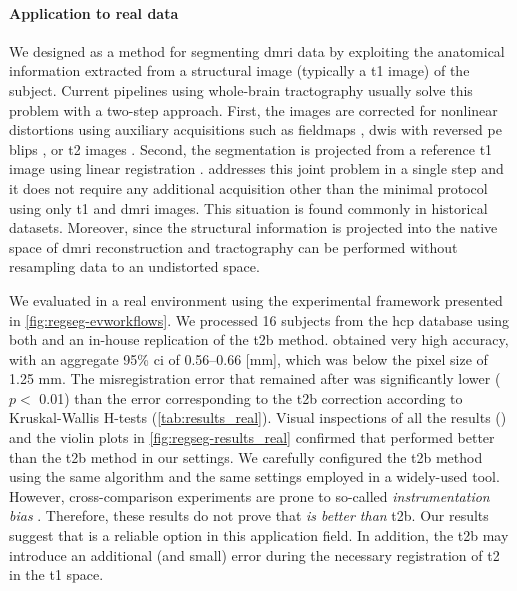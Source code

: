 \paragraph*{Application to real data}
We designed \regseg{} as a method for segmenting \gls*{dmri} data by exploiting the
  anatomical information extracted from a structural image (typically a \gls*{t1} image)
  of the subject.
Current pipelines using whole-brain tractography usually solve this problem with a two-step approach.
First, the images are corrected for nonlinear distortions using auxiliary acquisitions
  such as fieldmaps \citep{jezzard_correction_1995}, \glspl*{dwi} with reversed \gls*{pe}
  blips \citep{chiou_simple_2000}, or \gls*{t2} images \citep{kybic_unwarping_2000}.
Second, the segmentation is projected from a reference \gls*{t1} image using linear
  registration \citep{greve_accurate_2009}.
\Regseg{} addresses this joint problem in a single step and it does not require any additional
  acquisition other than the minimal protocol using only \gls*{t1} and \gls*{dmri} images.
This situation is found commonly in historical datasets.
Moreover, since the structural information is projected into the native space of \gls*{dmri}
  reconstruction and tractography can be performed without resampling data to an undistorted
  space.

We evaluated \regseg{} in a real environment using the experimental framework presented
  in \autoref{fig:regseg-evworkflows}.
We processed 16 subjects from the \gls*{hcp} database using both \regseg{}
  and an in-house replication of the \acrfull*{t2b} method.
\Regseg{} obtained very high accuracy, with an aggregate 95\% \gls*{ci} of 0.56--0.66 [mm], which was
  below the pixel size of 1.25 mm.
The misregistration error that remained after \regseg{} was significantly lower ($p <$ 0.01) than the
  error corresponding to the \gls*{t2b} correction according to Kruskal-Wallis H-tests
  (\autoref{tab:results_real}).
Visual inspections of all the results () and the violin plots in
  \autoref{fig:regseg-results_real} confirmed that \regseg{} performed better than the \gls*{t2b} method
  in our settings.
We carefully configured the \gls*{t2b} method using the same algorithm and the
  same settings employed in a widely-used tool.
However, cross-comparison experiments are prone to so-called \emph{instrumentation bias}
  \citep{tustison_instrumentation_2013}.
Therefore, these results do not prove that \regseg{} \emph{is better than} \gls*{t2b}.
Our results suggest that \regseg{} is a reliable option in this application field.
In addition, the \gls*{t2b} may introduce an additional (and small) error during the necessary
  registration of \gls*{t2} in the \gls*{t1} space.

